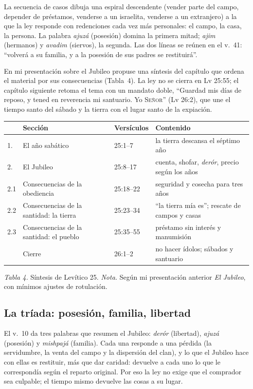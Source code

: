 \documentclass[11pt,letterpaper]{article}
\newcommand{\SENOR}{\textsc{Señor}}
\newcommand{\pie}[1]{\par{\footnotesize\color{sepia}#1\par}}
\begin{document}
La secuencia de casos dibuja una espiral descendente (vender parte del campo, depender de préstamos, venderse a un israelita, venderse a un extranjero) a la que la ley responde con redenciones cada vez más personales: el campo, la casa, la persona. La palabra \emph{ajuzá} (posesión) domina la primera mitad; \emph{ajim} (hermanos) y \emph{avadim} (siervos), la segunda. Las dos líneas se reúnen en el v.~41: ``volverá a su familia, y a la posesión de sus padres se restituirá''.

En mi presentación sobre el Jubileo propuse una síntesis del capítulo que ordena el material por sus consecuencias (Tabla~4). La ley no se cierra en Lv 25:55; el capítulo siguiente retoma el tema con un mandato doble, ``Guardad mis días de reposo, y tened en reverencia mi santuario. Yo \SENOR'' (Lv 26:2), que une el tiempo santo del sábado y la tierra con el lugar santo de la expiación.

\begin{center}\begin{minipage}{\linewidth}\centering\small\renewcommand{\arraystretch}{1.18}
\begin{tabular}{@{}L{1.0cm}L{6.0cm}L{2.2cm}L{5.4cm}@{}}
\toprule
& \textbf{Sección} & \textbf{Versículos} & \textbf{Contenido} \\ . & El año sabático & 25:1--7 & la tierra descansa el séptimo año \\
2. & El Jubileo & 25:8--17 & cuenta, shofar, \emph{derór}, precio según los años \\
2.1 & Consecuencias de la obediencia & 25:18--22 & seguridad y cosecha para tres años \\
2.2 & Consecuencias de la santidad: la tierra & 25:23--34 & ``la tierra mía es''; rescate de campos y casas \\
2.3 & Consecuencias de la santidad: el pueblo & 25:35--55 & préstamo sin interés y manumisión \\
& Cierre & 26:1--2 & no hacer ídolos; sábados y santuario \\
\bottomrule
\end{tabular}\par
\pie{\textit{Tabla 4.} Síntesis de Levítico 25. \textit{Nota.} Según mi presentación anterior \emph{El Jubileo}, con mínimos ajustes de rotulación.}
\end{minipage}\end{center}

\subsection{La tríada: posesión, familia, libertad}
El v.~10 da tres palabras que resumen el Jubileo: \emph{derór} (libertad), \emph{ajuzá} (posesión) y \emph{mishpajá} (familia). Cada una responde a una pérdida (la servidumbre, la venta del campo y la dispersión del clan), y lo que el Jubileo hace con ellas es restituir, más que dar caridad: devuelve a cada uno lo que le correspondía según el reparto original. Por eso la ley no exige que el comprador sea culpable; el tiempo mismo devuelve las cosas a su lugar.
\end{document}
